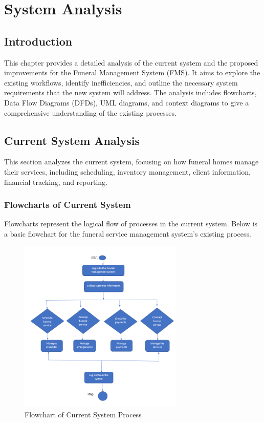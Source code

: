 \documentclass[a4paper,12pt]{report}
\begin{document}
\newpage
\chapter{System Analysis}

\section{Introduction}
This chapter provides a detailed analysis of the current system and the proposed improvements for the Funeral Management System (FMS). It aims to explore the existing workflows, identify inefficiencies, and outline the necessary system requirements that the new system will address. The analysis includes flowcharts, Data Flow Diagrams (DFDs), UML diagrams, and context diagrams to give a comprehensive understanding of the existing processes.

\section{Current System Analysis}
This section analyzes the current system, focusing on how funeral homes manage their services, including scheduling, inventory management, client information, financial tracking, and reporting.

\subsection{Flowcharts of Current System}
Flowcharts represent the logical flow of processes in the current system. Below is a basic flowchart for the funeral service management system’s existing process.

\begin{figure}[ht]
\centering
\includegraphics[width=0.7\textwidth]{../img/flow-chart.png}
\caption{Flowchart of Current System Process}
\label{fig:current_system_flowchart}
\end{figure}
\end{document}
